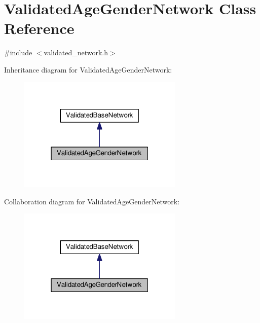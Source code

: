 \hypertarget{classValidatedAgeGenderNetwork}{}\section{Validated\+Age\+Gender\+Network Class Reference}
\label{classValidatedAgeGenderNetwork}


{\ttfamily \#include $<$validated\+\_\+network.\+h$>$}



Inheritance diagram for Validated\+Age\+Gender\+Network\+:
\nopagebreak
\begin{figure}[H]
\begin{center}
\leavevmode
\includegraphics[width=223pt]{classValidatedAgeGenderNetwork__inherit__graph}
\end{center}
\end{figure}


Collaboration diagram for Validated\+Age\+Gender\+Network\+:
\nopagebreak
\begin{figure}[H]
\begin{center}
\leavevmode
\includegraphics[width=223pt]{classValidatedAgeGenderNetwork__coll__graph}
\end{center}
\end{figure}
